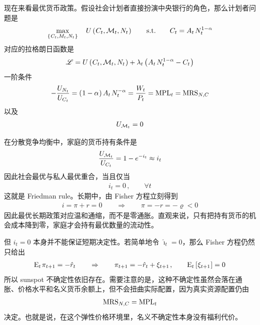 
现在来看最优货币政策。假设社会计划者直接扮演中央银行的角色，那么计划者问题是
\begin{align*}
    \max_{\bkd{C_t,M_t,N_t}}\quad U\bka{C_t,\cal M_t,N_t}
    \qquad\text{s.t.}\qquad
    C_t=A_t\,N_t^{1-\alpha}
\end{align*}
对应的拉格朗日函数是
\begin{align*}
    \scr L=U\bka{C_t,\cal M_t,N_t}+\lambda_t\bka{A_t\,N_t^{1-\alpha}-C_t}
\end{align*}
一阶条件
\begin{align*}
    -\dfrac{U_{N_t}}{U_{C_t}}
    =\bka{1-\alpha}A_t\,N_t^{-\alpha}
    =\dfrac{W_t}{P_t}
    =\n{MPL}_t
    =\n{MRS}_{N,C}
\end{align*}
以及
\begin{align*}
    U_{\cal M_t}=0
\end{align*}

\myskip
{}

在分散竞争均衡中，家庭的货币持有条件是
\begin{align*}
    \dfrac{U_{\cal M_t}}{U_{C_t}}=1-e^{-i_t}\approx i_t
\end{align*}
因此社会最优与私人最优重合，当且仅当
\begin{align*}
    i_t=0\,,\qquad \forall t
\end{align*}
这就是 Friedman rule。长期中，由 Fisher 方程立刻得到
\begin{align*}
    i=\pi+r=0
    \qquad\Rightarrow\qquad
    \pi=-r=-\varrho<0
\end{align*}
因此最优长期政策对应温和通缩，而不是零通胀。直观来说，只有把持有货币的机会成本降到零，家庭才会持有最优数量的流动性。

\myskip
{}

但 \(i_t=0\) 本身并不能保证短期决定性。若简单地令 \(\hat\imath_t=0\)，那么 Fisher 方程仍然只给出
\begin{align*}
    \meant\,\pi\nt=-\hat r_t
    \qquad\Rightarrow\qquad
    \pi\nt=-\hat r_t+\xi_{t+1}\,,\qquad \meant\bks{\xi_{t+1}}=0
\end{align*}
所以 sunspot 不确定性依旧存在。需要注意的是，这种不确定性虽然会落在通胀、价格水平和名义货币余额上，但不会扭曲实际配置，因为真实资源配置仍由
\begin{align*}
    \text{MRS}_{N,C}=\text{MPL}_t
\end{align*}
决定。也就是说，在这个弹性价格环境里，名义不确定性本身没有福利代价。

